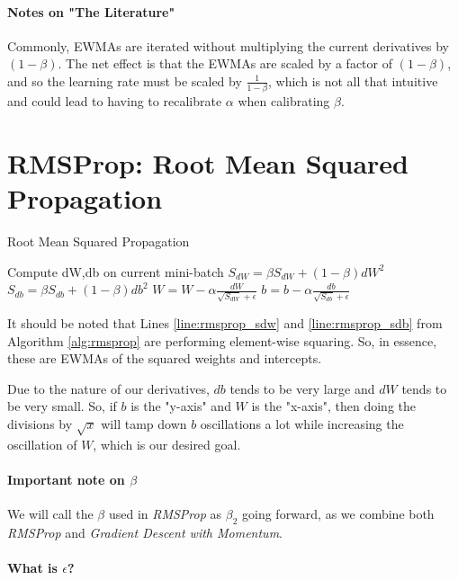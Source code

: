 \documentclass{article}
\begin{document}
\paragraph{Notes on "The Literature"}

Commonly, EWMAs are iterated without multiplying the current derivatives by $(1-\beta)$.  The net effect is that the EWMAs are scaled by a factor of $(1-\beta)$, and so the learning rate must be scaled by $\frac{1}{1-\beta}$, which is not all that intuitive and could lead to having to recalibrate $\alpha$ when calibrating $\beta$.

\section{RMSProp: Root Mean Squared Propagation}

\begin{algorithm}[h]
\label{alg:rmsprop}
\caption{Root Mean Squared Propagation}
Compute dW,db on current mini-batch \;
$S_{dW} = \beta S_{dW} + (1-\beta) dW^2$ \; \label{line:rmsprop_sdw}
$S_{db} = \beta S_{db} + (1-\beta) db^2$ \; \label{line:rmsprop_sdb}
$W = W - \alpha \frac{dW}{\sqrt{S_{dW}} + \epsilon}$ \;
$b = b - \alpha \frac{db}{\sqrt{S_{db}} + \epsilon}$ \;
\end{algorithm}

It should be noted that Lines \ref{line:rmsprop_sdw} and \ref{line:rmsprop_sdb} from Algorithm \ref{alg:rmsprop} are performing element-wise squaring.  So, in essence, these are EWMAs of the squared weights and intercepts.

Due to the nature of our derivatives, $db$ tends to be very large and $dW$ tends to be very small.  So, if $b$ is the "y-axis" and $W$ is the "x-axis", then doing the divisions by $\sqrt{x}$ will tamp down $b$ oscillations a lot while increasing the oscillation of $W$, which is our desired goal.

\paragraph{Important note on $\beta$}

We will call the $\beta$ used in \textit{RMSProp} as $\beta_2$ going forward, as we combine both \textit{RMSProp} and \textit{Gradient Descent with Momentum}.

\paragraph{What is $\epsilon$?}
\end{document}
